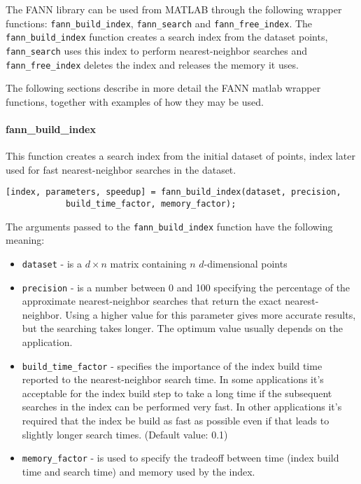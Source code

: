 \documentclass[letter,10pt]{article}
\begin{document}
The FANN library can be used from MATLAB through the following wrapper functions: \texttt{fann\_build\_index}, \texttt{fann\_search} and \texttt{fann\_free\_index}. The \texttt{fann\_build\_index} function creates a search index from the dataset points, \texttt{fann\_search} uses this index to perform nearest-neighbor searches and \texttt{fann\_free\_index} deletes the index and releases the memory it uses.

The following sections describe in more detail the FANN matlab wrapper functions, together with examples of how they may be used.

\paragraph{fann\_build\_index} 

This function creates a search index from the initial dataset of points, index later used for fast nearest-neighbor searches in the dataset.

\begin{Verbatim}
[index, parameters, speedup] = fann_build_index(dataset, precision, 
			build_time_factor, memory_factor);
\end{Verbatim}

The arguments passed to the \texttt{fann\_build\_index} function have the following meaning:
\begin{itemize}

\item \texttt{dataset} - is a $d \times n$ matrix containing $n$ $d$-dimensional points

\item \texttt{precision} - is a number between 0 and 100 specifying the percentage of the approximate nearest-neighbor searches that return the exact nearest-neighbor. Using a higher value for this parameter gives more accurate results, but the searching takes longer. The optimum value usually depends on the application.

\item \texttt{build\_time\_factor} - specifies the importance of the index build time reported to the nearest-neighbor search time. In some applications it's acceptable for the index build step to take a long time if the subsequent searches in the index can be performed very fast. In other applications it's required that the index be build as fast as possible even if that leads to slightly longer search times. (Default value: 0.1)

\item \texttt{memory\_factor} - is used to specify the tradeoff between time (index build time and search time) and memory used by the index.
\end{itemize}
\end{document}
